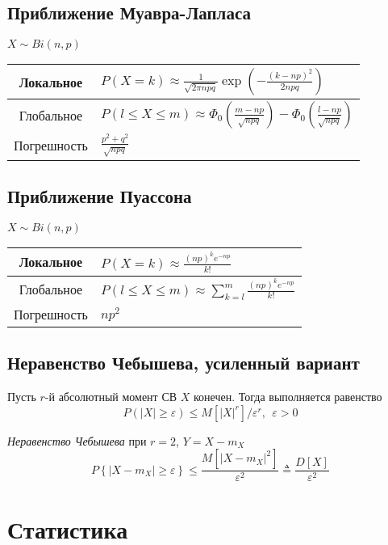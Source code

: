 \documentclass[12pt]{article}
\begin{document}
\subsection{Приближение Муавра-Лапласа}
$X \sim Bi(n,p)$
\begin{tabular}{c|l}
    Локальное &
    $P(X=k) \approx \frac{1}{\sqrt{2\pi npq}}
    \exp\left(-\frac{(k-np)^{2}}{2npq}\right)$
    \\ \hline
    Глобальное &
    $P(l\leqslant X\leqslant m)
    \approx \Phi_{0}\left(\frac{m-np}{\sqrt{npq}}\right)
    - \Phi_{0}\left(\frac{l-np}{\sqrt{npq}}\right)$
    \\ \hline
    Погрешность &
    $\frac{p^{2}+q^{2}}{\sqrt{npq}}$
    \\ \hline
\end{tabular}


\subsection{Приближение Пуассона}
$X \sim Bi(n,p)$
\begin{tabular}{c|l}
    Локальное &
    $P(X=k)\approx\frac{(np)^{k}e^{-np}}{k!}$
    \\ \hline
    Глобальное &
    $P(l\leqslant X\leqslant m)
    \approx\sum\limits_{k=l}^{m}\frac{(np)^{k}e^{-np}}{k!}$
    \\ \hline
    Погрешность &
    $np^{2}$
    \\ \hline
\end{tabular}

\subsection{Неравенство Чебышева, усиленный вариант}
Пусть $r$-й абсолютный момент СВ $X$ конечен. Тогда выполняется
равенство
\begin{displaymath}
    P(\left|X\right| \geqslant \varepsilon)
    \leqslant M\left[\left|X\right|^{r}\right]/\varepsilon^{r},
    \ \ \varepsilon > 0
\end{displaymath}
\par \textit{Неравенство Чебышева} при $r=2$, $Y=X-m_{X}$
\begin{displaymath}
    P\left\{\left|X-m_{X}\right| \geqslant \varepsilon \right\}
    \leqslant
    \frac{M\left[\left|X-m_{X}\right|^{2}\right]}{\varepsilon^{2}}
    \triangleq \frac{D\left[X\right]}{\varepsilon^{2}}
\end{displaymath}

\section{Статистика}
\end{document}
